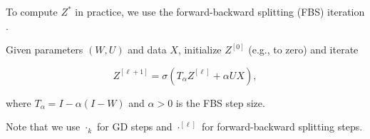 \documentclass[twoside]{article}
\begin{document}


To compute $Z^*$ in practice, we use the forward-backward splitting (FBS) iteration \citep{monotonedeq}.

\begin{definition}
Given parameters $(W, U)$ and data $X$, initialize $Z^{[0]}$ (e.g., to zero) and iterate

$$Z^{[\ell+1]} = \sigma\!\left(T_\alpha Z^{[\ell]} + \alpha U X\right),$$

where $T_\alpha = I - \alpha(I - W)$ and $\alpha > 0$ is the FBS step size.
\end{definition}


Note that we use $\cdot_k$ for GD steps and $\cdot^{[\ell]}$ for forward-backward splitting steps.

\end{document}
